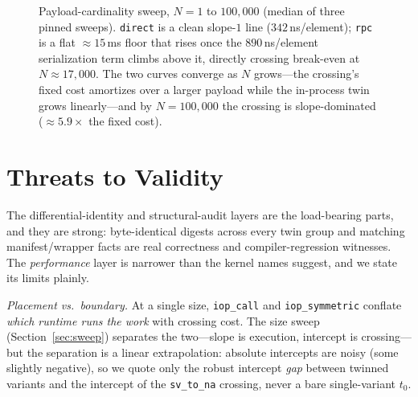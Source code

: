 \documentclass[conference]{IEEEtran}
\newcommand{\code}[1]{\texttt{#1}}
\begin{document}
\begin{figure}[t]
\centering
{}
\caption{Payload-cardinality sweep, $N{=}1$ to $100{,}000$ (median of three pinned
sweeps). \code{direct} is a clean slope-$1$ line ($342$\,ns/element); \code{rpc}
is a flat $\approx$$15$\,ms floor that rises once the $890$\,ns/element
serialization term climbs above it, directly crossing break-even at
$N\approx17{,}000$. The two curves converge as $N$ grows---the crossing's fixed
cost amortizes over a larger payload while the in-process twin grows
linearly---and by $N{=}100{,}000$ the crossing is slope-dominated
($\approx$$5.9\times$ the fixed cost).}
\label{fig:payload}
\end{figure}

\section{Threats to Validity}
\label{sec:threats}

The differential-identity and structural-audit layers are the load-bearing
parts, and they are strong: byte-identical digests across every twin group and
matching manifest/wrapper facts are real correctness and compiler-regression
witnesses. The \emph{performance} layer is narrower than the kernel names
suggest, and we state its limits plainly.

\emph{Placement vs.\ boundary.} At a single size, \code{iop\_call} and
\code{iop\_symmetric} conflate \emph{which runtime runs the work} with crossing
cost. The size sweep (Section~\ref{sec:sweep}) separates the two---slope is
execution, intercept is crossing---but the separation is a linear extrapolation:
absolute intercepts are noisy (some slightly negative), so we quote only the
robust intercept \emph{gap} between twinned variants and the intercept of the
\code{sv\_to\_na} crossing, never a bare single-variant $t_0$.
\end{document}
